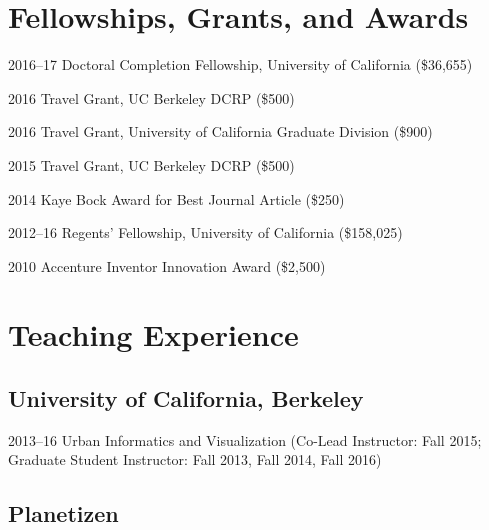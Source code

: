 \documentclass{academiccv}
\begin{document}
\section*{Fellowships, Grants, and Awards}

\begin{tablist}
	
\item[2016--17] \tab Doctoral Completion Fellowship, University of California (\$36,655)

\item[2016]     \tab Travel Grant, UC Berkeley DCRP (\$500)

\item[2016]     \tab Travel Grant, University of California Graduate Division (\$900)

\item[2015]     \tab Travel Grant, UC Berkeley DCRP (\$500)

\item[2014]     \tab Kaye Bock Award for Best Journal Article (\$250)

\item[2012--16] \tab Regents' Fellowship, University of California (\$158,025)

\item[2010]     \tab Accenture Inventor Innovation Award (\$2,500)

\end{tablist}



\section*{Teaching Experience}

\subsection*{University of California, Berkeley}

\begin{tablist}
	
\item[2013--16]	\tab Urban Informatics and Visualization (Co-Lead Instructor: Fall 2015; Graduate Student Instructor: Fall 2013, Fall 2014, Fall 2016)
	
\end{tablist}

\subsection*{Planetizen}
\end{document}
